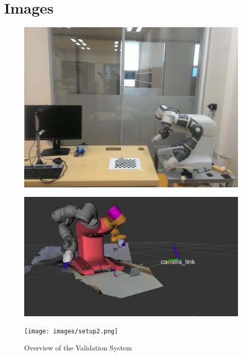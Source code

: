 \appendix
\chapter*{Images}
\label{chap:results}


\begin{figure}[htp]
\begin{center}
{
  \includegraphics[clip,width=0.5\columnwidth]{images/setup1.jpg}
}
\end{center}
\begin{center}
{
  \includegraphics[clip,width=0.5\columnwidth]{images/system1.jpg}
}
\end{center}
\begin{center}
{
  \texttt{[image: images/setup2.png]}
}
\end{center}
\caption{Overview of the Validation System}
\label{setupsystem}
\end{figure}



